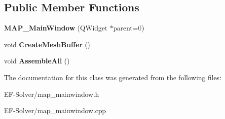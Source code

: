 \subsection*{Public Member Functions}
\begin{DoxyCompactItemize}
\item 
{\bfseries M\+A\+P\+\_\+\+Main\+Window} (Q\+Widget $\ast$parent=0)\hypertarget{class_m_a_p___main_window_a33eac925ce07cdca9c41e22dd53aac2c}{}\label{class_m_a_p___main_window_a33eac925ce07cdca9c41e22dd53aac2c}

\item 
void {\bfseries Create\+Mesh\+Buffer} ()\hypertarget{class_m_a_p___main_window_acf8211bf8c159896e9786bd7be76e588}{}\label{class_m_a_p___main_window_acf8211bf8c159896e9786bd7be76e588}

\item 
void {\bfseries Assemble\+All} ()\hypertarget{class_m_a_p___main_window_af8f8064e36ccf1dd7dac276d5cb58299}{}\label{class_m_a_p___main_window_af8f8064e36ccf1dd7dac276d5cb58299}

\end{DoxyCompactItemize}


The documentation for this class was generated from the following files\+:\begin{DoxyCompactItemize}
\item 
E\+F-\/\+Solver/map\+\_\+mainwindow.\+h\item 
E\+F-\/\+Solver/map\+\_\+mainwindow.\+cpp\end{DoxyCompactItemize}

